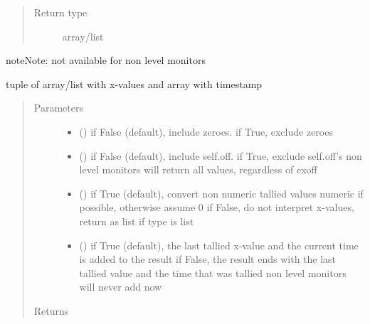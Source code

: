 \documentclass[letterpaper,10pt,english]{sphinxmanual}
\begin{document}
\begin{fulllineitems}
\begin{fulllineitems}
\begin{quote}
\begin{description}
\item[{Return type}] \leavevmode
array/list

\end{description}\end{quote}

\begin{sphinxadmonition}{note}{Note:}
not available for non level monitors
\end{sphinxadmonition}

\end{fulllineitems}


\begin{fulllineitems}
\label{\detokenize{Reference:salabim.Monitor.xt}}
tuple of array/list with x-values and array with timestamp
\begin{quote}\begin{description}
\item[{Parameters}] \leavevmode\begin{itemize}
\item {} 
 () \textendash{} if False (default), include zeroes. if True, exclude zeroes

\item {} 
 () \textendash{} if False (default), include self.off. if True, exclude self.off’s 
non level monitors will return all values, regardless of exoff

\item {} 
 () \textendash{} if True (default), convert non numeric tallied values numeric if possible, otherwise assume 0 
if False, do not interpret x-values, return as list if type is list

\item {} 
 () \textendash{} if True (default), the last tallied x-value and the current time is added to the result 
if False, the result ends with the last tallied value and the time that was tallied 
non level monitors will never add now

\end{itemize}

\item[{Returns}] \leavevmode
{}


\end{description}
\end{quote}
\end{fulllineitems}
\end{fulllineitems}
\end{document}
